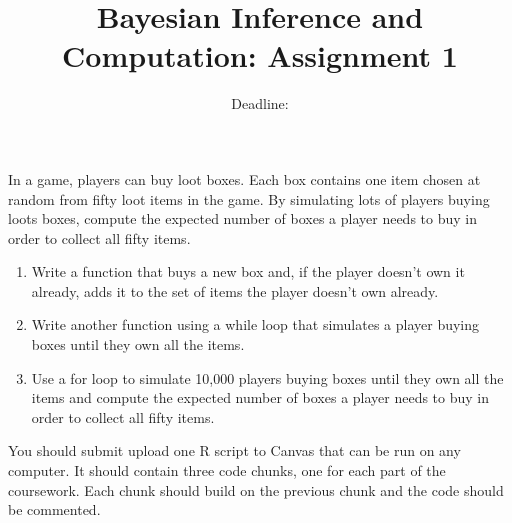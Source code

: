 \documentclass{article}
\title{Bayesian Inference and Computation: Assignment 1}
\date{Deadline: }
\begin{document}
\maketitle

In a game, players can buy loot boxes. Each box contains one item chosen at random from fifty loot items in the game. By simulating lots of players buying loots boxes, compute the expected number of boxes a player needs to buy in order to collect all fifty items. 

\begin{enumerate}
    \item Write a function that buys a new box and, if the player doesn't own it already, adds it to the set of items the player doesn't own already. 
    \item Write another function using a while loop that simulates a player buying boxes until they own all the items. 
    \item Use a for loop to simulate 10,000 players buying boxes until they own all the items and compute the expected number of boxes a player needs to buy in order to collect all fifty items. 
\end{enumerate}
You should submit upload one R script to Canvas that can be run on any computer. It should contain three code chunks, one for each part of the coursework. Each chunk should build on the previous chunk and the code should be commented. 
\end{document}
